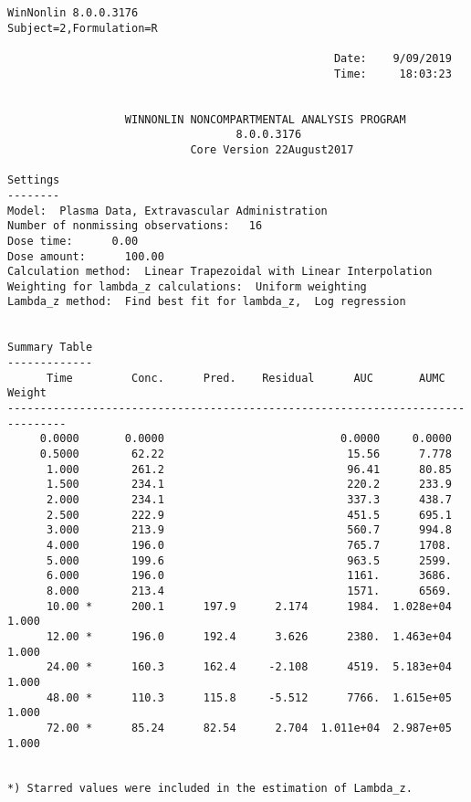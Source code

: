 \documentclass[12pt,a4paper]{article}
\begin{document}
\begin{verbatim}
WinNonlin 8.0.0.3176
Subject=2,Formulation=R

                                                  Date:    9/09/2019
                                                  Time:     18:03:23


                  WINNONLIN NONCOMPARTMENTAL ANALYSIS PROGRAM
                                   8.0.0.3176
                            Core Version 22August2017

Settings
--------
Model:  Plasma Data, Extravascular Administration
Number of nonmissing observations:   16
Dose time:      0.00
Dose amount:      100.00
Calculation method:  Linear Trapezoidal with Linear Interpolation
Weighting for lambda_z calculations:  Uniform weighting
Lambda_z method:  Find best fit for lambda_z,  Log regression


Summary Table
-------------
      Time         Conc.      Pred.    Residual      AUC       AUMC      Weight
-------------------------------------------------------------------------------
     0.0000       0.0000                           0.0000     0.0000
     0.5000        62.22                            15.56      7.778
      1.000        261.2                            96.41      80.85
      1.500        234.1                            220.2      233.9
      2.000        234.1                            337.3      438.7
      2.500        222.9                            451.5      695.1
      3.000        213.9                            560.7      994.8
      4.000        196.0                            765.7      1708.
      5.000        199.6                            963.5      2599.
      6.000        196.0                            1161.      3686.
      8.000        213.4                            1571.      6569.
      10.00 *      200.1      197.9      2.174      1984.  1.028e+04      1.000
      12.00 *      196.0      192.4      3.626      2380.  1.463e+04      1.000
      24.00 *      160.3      162.4     -2.108      4519.  5.183e+04      1.000
      48.00 *      110.3      115.8     -5.512      7766.  1.615e+05      1.000
      72.00 *      85.24      82.54      2.704  1.011e+04  2.987e+05      1.000


*) Starred values were included in the estimation of Lambda_z.



\end{verbatim}
\end{document}
